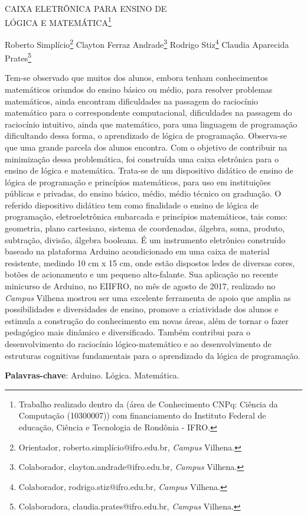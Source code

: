 \documentclass[article,12pt,onesidea,4paper,english,brazil]{abntex2}
\begin{document}
	
	
	\frenchspacing 
	
	\begin{center}
		\LARGE CAIXA ELETRÔNICA PARA ENSINO DE\\LÓGICA E MATEMÁTICA\footnote{Trabalho realizado dentro da (área de Conhecimento CNPq: Ciência da Computação (10300007))
		com financiamento do Instituto Federal de educação, Ciência e Tecnologia de Rondônia - IFRO.}
		
		\normalsize
		Roberto Simplício\footnote{Orientador, roberto.simplício@ifro.edu.br, \textit{Campus} Vilhena.} 
		Clayton Ferraz Andrade\footnote{Colaborador, clayton.andrade@ifro.edu.br, \textit{Campus} Vilhena.} 
		Rodrigo Stiz\footnote{Colaborador, rodrigo.stiz@ifro.edu.br, \textit{Campus} Vilhena.} 
		Claudia Aparecida Prates\footnote{Colaboradora, claudia.prates@ifro.edu.br, \textit{Campus} Vilhena.} 
	\end{center}
	
	\noindent Tem-se observado que muitos dos alunos, embora tenham conhecimentos
	matemáticos oriundos do ensino básico ou médio, para resolver problemas
	matemáticos, ainda encontram dificuldades na passagem do raciocínio matemático
	para o correspondente computacional, dificuldades na passagem do raciocínio
	intuitivo, ainda que matemático, para uma linguagem de programação dificultando
	dessa forma, o aprendizado de lógica de programação. Observa-se que uma grande
	parcela dos alunos encontra. Com o objetivo de contribuir na minimização dessa
	problemática, foi construída uma caixa eletrônica para o ensino de lógica e
	matemática. Trata-se de um dispositivo didático de ensino de lógica de programação
	e princípios matemáticos, para uso em instituições públicas e privadas, do ensino
	básico, médio, médio técnico ou graduação. O referido dispositivo didático tem como
	finalidade o ensino de lógica de programação, eletroeletrônica embarcada e
	princípios matemáticos, tais como: geometria, plano cartesiano, sistema de
	coordenadas, álgebra, soma, produto, subtração, divisão, álgebra booleana. É um
	instrumento eletrônico construído baseado na plataforma Arduino acondicionado em
	uma caixa de material resistente, medindo 10 cm x 15 cm, onde estão dispostos
	ledes de diversas cores, botões de acionamento e um pequeno alto-falante. Sua
	aplicação no recente minicurso de Arduino, no EIIFRO, no mês de agosto de 2017,
	realizado no \textit{Campus} Vilhena mostrou ser uma excelente ferramenta de apoio que
	amplia as possibilidades e diversidades de ensino, promove a criatividade dos
	alunos e estimula a construção do conhecimento em novas áreas, além de tornar o
	fazer pedagógico mais dinâmico e diversificado. Também contribui para o
	desenvolvimento do raciocínio lógico-matemático e ao desenvolvimento de
	estruturas cognitivas fundamentais para o aprendizado da lógica de programação.
	
	\vspace{\onelineskip}
	
	\noindent
	\textbf{Palavras-chave}: Arduino. Lógica. Matemática.
	
\end{document}
